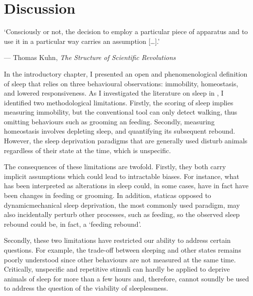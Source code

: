 \edef\figdir{\currfiledir/fig}


\chapter{Discussion} \label{discussion}

\epigraph{
	
	`Consciously or not, the decision to employ a particular piece of apparatus and to use it in a particular way carries an assumption [\dots].'
	}{--- Thomas Kuhn, \emph{The Structure of Scientific
	Revolutions}~\cite[VI]{kuhn_structure_1962}
}


In the introductory chapter, I presented an open and phenomenological definition of sleep that relies on three behavioural observations:
immobility, homeostasis, and lowered responsiveness.
As I investigated the literature on sleep in \droso, 
I identified two methodological limitations. 
Firstly, the scoring of sleep implies measuring immobility, but the conventional tool can only detect walking, thus omitting behaviours such as grooming an feeding.
Secondly, measuring homeostasis involves depleting sleep, and quantifying its subsequent rebound.
However, the sleep deprivation paradigms that are generally used disturb animals regardless of their state at the time, which is unspecific.

The consequences of these limitations are twofold. 
Firstly, they both carry implicit assumptions which could lead to intractable biases. 
For instance, what has been interpreted as alterations in sleep could, in some cases, have in fact have been changes in feeding or grooming. 
In addition, static\emd{}as opposed to dynamic\emd{}mechanical sleep deprivation, the most commonly used paradigm, may also incidentally perturb other processes, such as feeding, so the observed sleep rebound could be, in fact, a `feeding rebound'.

Secondly, these two limitations have restricted our ability to address certain questions.
For example, the trade-off between sleeping and other states remains poorly understood since other behaviours are not measured at the same time.
Critically, unspecific and repetitive stimuli can hardly be applied to deprive animals of sleep for more than a few hours
and, therefore, cannot soundly be used to address the question of the viability of sleeplessness.

